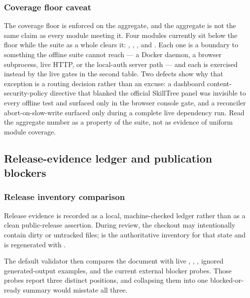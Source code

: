 \documentclass[
  english,
]{article}
\begin{document}
\subsubsection{Coverage floor caveat}\label{coverage-floor-caveat}

The coverage floor is enforced on the aggregate, and the aggregate is
not the same claim as every module meeting it. Four modules currently
sit below the floor while the suite as a whole clears it:
,
,
, and
. Each one is a boundary to something
the offline suite cannot reach --- a Docker daemon, a browser
subprocess, live HTTP, or the local-auth server path --- and each is
exercised instead by the live gates in the second table. Two defects
show why that exception is a routing decision rather than an excuse: a
dashboard content-security-policy directive that blanked the official
SkillTree panel was invisible to every offline test and surfaced only in
the browser console gate, and a reconciler abort-on-slow-write surfaced
only during a complete live dependency run. Read the aggregate number as
a property of the suite, not as evidence of uniform module coverage.

\subsection{Release-evidence ledger and publication
blockers}\label{release-evidence-ledger-and-publication-blockers}

\subsubsection{Release inventory
comparison}\label{release-inventory-comparison}

Release evidence is recorded as a local, machine-checked ledger rather
than as a clean public-release assertion. During review, the checkout
may intentionally contain dirty or untracked files;
 is the authoritative
inventory for that state and is regenerated with
.

The default validator then compares the document with live
,
,
, ignored generated-output examples, and the
current external blocker probes. Those probes report three distinct
positions, and collapsing them into one blocked-or-ready summary would
misstate all three.
\end{document}
